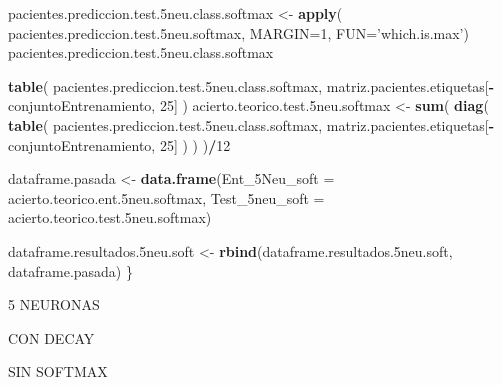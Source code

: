 \documentclass[]{article}
\newenvironment{Shaded}{\begin{snugshade}}{\end{snugshade}}
\newcommand{\KeywordTok}[1]{\textcolor[rgb]{0.13,0.29,0.53}{\textbf{#1}}}
\newcommand{\DataTypeTok}[1]{\textcolor[rgb]{0.13,0.29,0.53}{#1}}
\newcommand{\DecValTok}[1]{\textcolor[rgb]{0.00,0.00,0.81}{#1}}
\newcommand{\StringTok}[1]{\textcolor[rgb]{0.31,0.60,0.02}{#1}}
\newcommand{\OperatorTok}[1]{\textcolor[rgb]{0.81,0.36,0.00}{\textbf{#1}}}
\newcommand{\NormalTok}[1]{#1}
\begin{document}
\begin{Shaded}
\begin{Highlighting}[]
\NormalTok{  pacientes.prediccion.test.5neu.class.softmax <-}\StringTok{ }\KeywordTok{apply}\NormalTok{( pacientes.prediccion.test.5neu.softmax, }\DataTypeTok{MARGIN=}\DecValTok{1}\NormalTok{, }\DataTypeTok{FUN=}\StringTok{'which.is.max'}\NormalTok{)}
\NormalTok{  pacientes.prediccion.test.5neu.class.softmax}
  
  \KeywordTok{table}\NormalTok{( pacientes.prediccion.test.5neu.class.softmax, matriz.pacientes.etiquetas[}\OperatorTok{-}\NormalTok{conjuntoEntrenamiento, }\DecValTok{25}\NormalTok{] )}
\NormalTok{  acierto.teorico.test.5neu.softmax <-}\StringTok{ }\KeywordTok{sum}\NormalTok{( }\KeywordTok{diag}\NormalTok{( }\KeywordTok{table}\NormalTok{( pacientes.prediccion.test.5neu.class.softmax, matriz.pacientes.etiquetas[}\OperatorTok{-}\NormalTok{conjuntoEntrenamiento, }\DecValTok{25}\NormalTok{] ) ) )}\OperatorTok{/}\DecValTok{12}
  
  
\NormalTok{  dataframe.pasada <-}\StringTok{ }\KeywordTok{data.frame}\NormalTok{(}\DataTypeTok{Ent_5Neu_soft =}\NormalTok{ acierto.teorico.ent.5neu.softmax,}
                                 \DataTypeTok{Test_5neu_soft =}\NormalTok{ acierto.teorico.test.5neu.softmax)}
  
\NormalTok{  dataframe.resultados.5neu.soft <-}\StringTok{ }\KeywordTok{rbind}\NormalTok{(dataframe.resultados.5neu.soft, dataframe.pasada)}
\NormalTok{\}}
\end{Highlighting}
\end{Shaded}

5 NEURONAS

CON DECAY

SIN SOFTMAX
\end{document}
